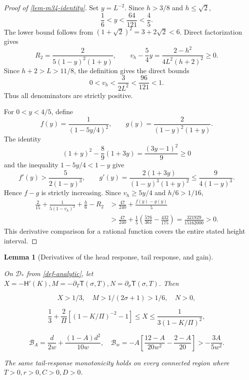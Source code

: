 \documentclass[11pt,a4paper]{article}
\theoremstyle{proofmanuscript}
\newtheorem{lemma}[theorem]{Lemma}
\begin{document}
\begin{proof}[Proof of \ref{lem-m34-identity}]

Set \(y=L^{-2}\). Since \(h>3/8\) and \(h\le\sqrt2\), \[
\frac16<y<\frac{64}{121}<\frac45.
\] The lower bound follows from \((1+\sqrt2)^2=3+2\sqrt2<6\). Direct factorization gives \[
R_2=\frac2{5(1-y)^2(1+y)},\qquad
v_h-\frac54y=\frac{2-h^2}{4L^2(h+2)^2}\ge0.
\] Since \(h+2>L>11/8\), the definition gives the direct bounds \[
0<v_h<\frac3{2L^2}<\frac{96}{121}<1.
\] Thus all denominators are strictly positive.

For \(0<y<4/5\), define \[
f(y)=\frac1{(1-5y/4)^2},\qquad
g(y)=\frac2{(1-y)^2(1+y)}.
\] The identity \[
(1+y)^2-\frac89(1+3y)=\frac{(3y-1)^2}{9}\ge0
\] and the inequality \(1-5y/4<1-y\) give \[
f'(y)>\frac{5}{2(1-y)^3},\qquad
g'(y)=\frac{2(1+3y)}{(1-y)^3(1+y)^2}
\le\frac9{4(1-y)^3}.
\] Hence \(f-g\) is strictly increasing. Since \(v_h\ge5y/4\) and \(h/6>1/16\), \[
\begin{aligned}
\frac2{15}+\frac1{5(1-v_h)^2}+\frac h6-R_2
&>\frac{47}{240}+\frac{f(y)-g(y)}5\\
&>\frac{47}{240}+\frac15\left(\frac{576}{361}-\frac{432}{175}\right)
=\frac{321929}{15162000}>0.
\end{aligned}
\] This derivative comparison for a rational function covers the entire stated height interval.

\end{proof}

\begin{lemma}[Derivatives of the head response, tail response, and gain]\label{lem-derivatives}

On \(\mathcal D_*\) from \ref{def-analytic}, let \(X=-\mathsf H'(K),M=-\partial_T\mathsf T(\sigma,T),N=\partial_\sigma\mathsf T(\sigma,T)\). Then

\[
X>1/3,\quad M>1/(2\sigma+1)>1/6,\quad N>0,
\]

\[
\frac13+\frac2\Pi[(1-K/\Pi)^{-2}-1]\le X\le\frac1{3(1-K/\Pi)^2},
\]

\[
\mathcal B_A=\frac d{2w}+\frac{(1-A)d^2}{10w},\quad \mathcal B_w=-A\left[\frac{12-A}{20w^2}-\frac{2-A}{20}\right]>-\frac{3A}{5w^2}.
\]

The same tail-response monotonicity holds on every connected region where \(T>0,r>0,C>0,D>0\).

\end{lemma}
\end{document}
